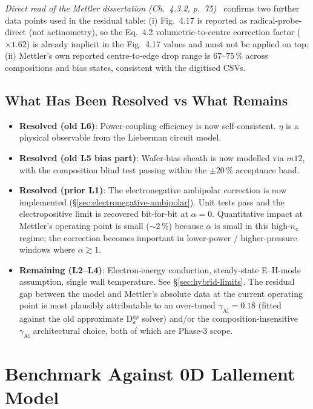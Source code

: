 \documentclass[11pt,a4paper]{report}
\begin{document}
\emph{Direct read of the Mettler dissertation (Ch.~4.3.2, p.~75)~\cite{Mettler2025}} confirms two further data points used in the residual table: (i) Fig.~4.17 is reported as radical-probe-direct (not actinometry), so the Eq.~4.2 volumetric-to-centre correction factor ($\times 1.62$) is already implicit in the Fig.~4.17 values and must not be applied on top; (ii) Mettler's own reported centre-to-edge drop range is $67$--$75\,\%$ across compositions and bias states, consistent with the digitised CSVs.

\subsection{What Has Been Resolved vs What Remains}

\begin{itemize}
  \item \textbf{Resolved (old L6)}: Power-coupling efficiency is now self-consistent.  $\eta$ is a physical observable from the Lieberman circuit model.
  \item \textbf{Resolved (old L5 bias part)}: Wafer-bias sheath is now modelled via $m12$, with the composition blind test passing within the $\pm 20\,\%$ acceptance band.
  \item \textbf{Resolved (prior L1)}: The electronegative ambipolar correction is now implemented (\S\ref{sec:electronegative-ambipolar}).  Unit tests pass and the electropositive limit is recovered bit-for-bit at $\alpha=0$.  Quantitative impact at Mettler's operating point is small ($\sim 2\,\%$) because $\alpha$ is small in this high-$n_e$ regime; the correction becomes important in lower-power / higher-pressure windows where $\alpha \gtrsim 1$.
  \item \textbf{Remaining (L2--L4)}: Electron-energy conduction, steady-state E--H-mode assumption, single wall temperature.  See \S\ref{sec:hybrid-limits}.  The residual gap between the model and Mettler's absolute data at the current operating point is most plausibly attributable to an over-tuned $\gamma_\mathrm{Al} = 0.18$ (fitted against the old approximate D$_a^\mathrm{ep}$ solver) and/or the composition-insensitive $\gamma_\mathrm{Al}$ architectural choice, both of which are Phase-3 scope.
\end{itemize}


\section{Benchmark Against 0D Lallement Model}
\label{sec:benchmark-0d}
\end{document}
